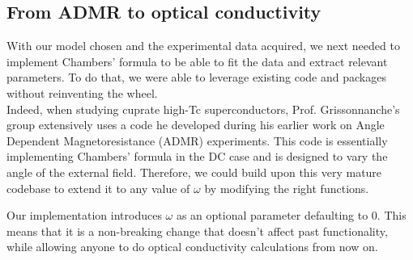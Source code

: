 \subsection{From ADMR to optical conductivity}
With our model chosen and the experimental data acquired, 
we next needed to implement Chambers' formula to be able to fit the data and extract relevant parameters. 
To do that, we were able to leverage existing code and packages without reinventing the wheel. \\

Indeed, when studying cuprate high-Tc superconductors, 
Prof. Grissonnanche's group extensively uses a code he developed during his earlier work on Angle Dependent Magnetoresistance (ADMR) experiments. 
This code is essentially implementing Chambers' formula in the DC case and is designed to vary the angle of the external field. 
Therefore, we could build upon this very mature codebase to extend it to any value of $\omega$ by modifying the right functions.

Our implementation introduces $\omega$ as an optional parameter defaulting to $0$. 
This means that it is a non-breaking change that doesn't affect past functionality, 
while allowing anyone to do optical conductivity calculations from now on. \\